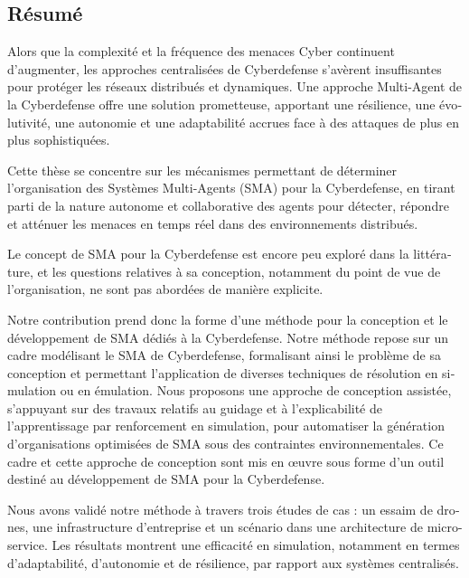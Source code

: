 \begingroup
\let\clearpage\relax
\let\cleardoublepage\relax
\let\cleardoublepage\relax

\begin{otherlanguage}{ngerman}
    \chapter*{Résumé}

    Alors que la complexité et la fréquence des menaces Cyber continuent d'augmenter, les approches centralisées de Cyberdefense s'avèrent insuffisantes pour protéger les réseaux distribués et dynamiques. Une approche Multi-Agent de la Cyberdefense offre une solution prometteuse, apportant une résilience, une évolutivité, une autonomie et une adaptabilité accrues face à des attaques de plus en plus sophistiquées.

    Cette thèse se concentre sur les mécanismes permettant de déterminer l'organisation des Systèmes Multi-Agents (SMA) pour la Cyberdefense, en tirant parti de la nature autonome et collaborative des agents pour détecter, répondre et atténuer les menaces en temps réel dans des environnements distribués.
    
    Le concept de SMA pour la Cyberdefense est encore peu exploré dans la littérature, et les questions relatives à sa conception, notamment du point de vue de l'organisation, ne sont pas abordées de manière explicite.
    
    Notre contribution prend donc la forme d'une méthode pour la conception et le développement de SMA dédiés à la Cyberdefense. Notre méthode repose sur un cadre modélisant le SMA de Cyberdefense, formalisant ainsi le problème de sa conception et permettant l'application de diverses techniques de résolution en simulation ou en émulation. Nous proposons une approche de conception assistée, s'appuyant sur des travaux relatifs au guidage et à l'explicabilité de l'apprentissage par renforcement en simulation, pour automatiser la génération d'organisations optimisées de SMA sous des contraintes environnementales. Ce cadre et cette approche de conception sont mis en œuvre sous forme d'un outil destiné au développement de SMA pour la Cyberdefense.
    
    Nous avons validé notre méthode à travers trois études de cas : un essaim de drones, une infrastructure d'entreprise et un scénario dans une architecture de micro-service. Les résultats montrent une efficacité en simulation, notamment en termes d'adaptabilité, d'autonomie et de résilience, par rapport aux systèmes centralisés.


\end{otherlanguage}
